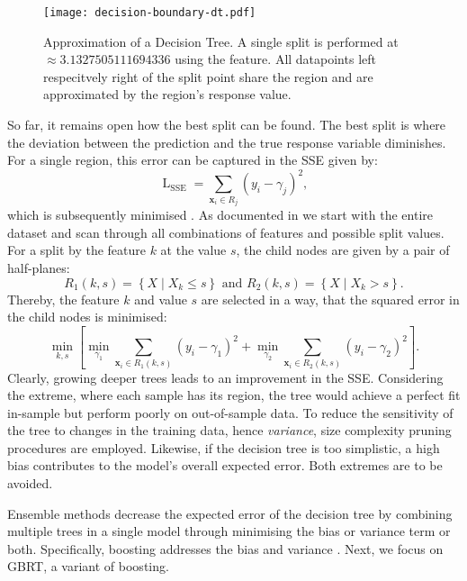 \begin{figure}[ht]
    \centering
    \texttt{[image: decision-boundary-dt.pdf]}
    \caption[Approximation of Decision Tree]{Approximation of a Decision Tree. A single split is performed at $\approx\num{3.1327505111694336}$ using the feature. All datapoints left respecitvely right of the split point share the region and are approximated by the region's response value.}
    \label{fig:decision-boundary-dt}
\end{figure}

So far, it remains open how the best split can be found. The best split is where the deviation between the prediction and the true response variable diminishes. For a single region, this error can be captured in the \gls{SSE} given by:
\begin{equation}
    \operatorname{L}_{\mathrm{SSE}} =\sum_{\mathbf{x}_{i} \in R_j}\left(y_{i}-\gamma_{j}\right)^{2},
\end{equation}
which is subsequently minimised \autocite[][231]{breimanClassificationRegressionTrees2017}. As documented in \textcite[][326]{hastietrevorElementsStatisticalLearning2009} we start with the entire dataset and scan through all combinations of features and possible split values. For a split by the feature $k$ at the value $s$, the child nodes are given by a pair of half-planes:
\begin{equation}
    R_1(k, s)=\left\{X \mid X_k \leq s\right\} \text { and } R_2(k, s)=\left\{X \mid X_k>s\right\}.
\end{equation}
Thereby, the feature $k$ and value $s$ are selected in a way, that the squared error in the child nodes is minimised:
\begin{equation}
    \min _{k, s}\left[\min _{\gamma_1} \sum_{\mathbf{x}_i \in R_1(k, s)}\left(y_i-\gamma_1\right)^2+\min _{\gamma_2} \sum_{\mathbf{x}_i \in R_2(k, s)}\left(y_i-\gamma_2\right)^2\right].
\end{equation}
Clearly, growing deeper trees leads to an improvement in the \gls{SSE}. Considering the extreme, where each sample has its region, the tree would achieve a perfect fit in-sample but perform poorly on out-of-sample data. To reduce the sensitivity of the tree to changes in the training data, hence \emph{variance}, size complexity pruning procedures are employed. Likewise, if the decision tree is too simplistic, a high bias contributes to the model's overall expected error. Both extremes are to be avoided.

Ensemble methods decrease the expected error of the decision tree by combining multiple trees in a single model through minimising the bias or variance term or both. Specifically, boosting addresses the bias and variance \autocites[][1672]{schapireBoostingMarginNew1998}[][29]{breimanRandomForests2001}. Next, we focus on \gls{GBRT}, a variant of boosting.

